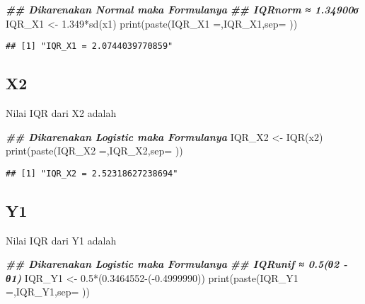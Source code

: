 \documentclass[
]{article}
\newenvironment{Shaded}{\begin{snugshade}}{\end{snugshade}}
\newcommand{\AttributeTok}[1]{\textcolor[rgb]{0.77,0.63,0.00}{#1}}
\newcommand{\DocumentationTok}[1]{\textcolor[rgb]{0.56,0.35,0.01}{\textbf{\textit{#1}}}}
\newcommand{\FloatTok}[1]{\textcolor[rgb]{0.00,0.00,0.81}{#1}}
\newcommand{\FunctionTok}[1]{\textcolor[rgb]{0.00,0.00,0.00}{#1}}
\newcommand{\NormalTok}[1]{#1}
\newcommand{\OtherTok}[1]{\textcolor[rgb]{0.56,0.35,0.01}{#1}}
\newcommand{\SpecialCharTok}[1]{\textcolor[rgb]{0.00,0.00,0.00}{#1}}
\newcommand{\StringTok}[1]{\textcolor[rgb]{0.31,0.60,0.02}{#1}}
\begin{document}
\begin{Shaded}
\begin{Highlighting}[]
\DocumentationTok{\#\# Dikarenakan Normal maka Formulanya }
\DocumentationTok{\#\# IQRnorm ≈ 1.34900σ}
\NormalTok{IQR\_X1 }\OtherTok{\textless{}{-}} \FloatTok{1.349}\SpecialCharTok{*}\FunctionTok{sd}\NormalTok{(x1)}
\FunctionTok{print}\NormalTok{(}\FunctionTok{paste}\NormalTok{(}\StringTok{\textquotesingle{}IQR\_X1 =\textquotesingle{}}\NormalTok{,IQR\_X1,}\AttributeTok{sep=}\StringTok{\textquotesingle{} \textquotesingle{}}\NormalTok{))}
\end{Highlighting}
\end{Shaded}

\begin{verbatim}
## [1] "IQR_X1 = 2.0744039770859"
\end{verbatim}

\hypertarget{x2-3}{%
\subsection{X2}\label{x2-3}}

Nilai IQR dari X2 adalah

\begin{Shaded}
\begin{Highlighting}[]
\DocumentationTok{\#\# Dikarenakan Logistic maka Formulanya }
\NormalTok{IQR\_X2 }\OtherTok{\textless{}{-}} \FunctionTok{IQR}\NormalTok{(x2)}
\FunctionTok{print}\NormalTok{(}\FunctionTok{paste}\NormalTok{(}\StringTok{\textquotesingle{}IQR\_X2 =\textquotesingle{}}\NormalTok{,IQR\_X2,}\AttributeTok{sep=}\StringTok{\textquotesingle{} \textquotesingle{}}\NormalTok{))}
\end{Highlighting}
\end{Shaded}

\begin{verbatim}
## [1] "IQR_X2 = 2.52318627238694"
\end{verbatim}

\hypertarget{y1-3}{%
\subsection{Y1}\label{y1-3}}

Nilai IQR dari Y1 adalah

\begin{Shaded}
\begin{Highlighting}[]
\DocumentationTok{\#\# Dikarenakan Logistic maka Formulanya }
\DocumentationTok{\#\# IQRunif ≈ 0.5(θ2 {-} θ1)}
\NormalTok{IQR\_Y1 }\OtherTok{\textless{}{-}} \FloatTok{0.5}\SpecialCharTok{*}\NormalTok{(}\FloatTok{0.3464552}\SpecialCharTok{{-}}\NormalTok{(}\SpecialCharTok{{-}}\FloatTok{0.4999990}\NormalTok{))}
\FunctionTok{print}\NormalTok{(}\FunctionTok{paste}\NormalTok{(}\StringTok{\textquotesingle{}IQR\_Y1 =\textquotesingle{}}\NormalTok{,IQR\_Y1,}\AttributeTok{sep=}\StringTok{\textquotesingle{} \textquotesingle{}}\NormalTok{))}
\end{Highlighting}
\end{Shaded}
\end{document}
